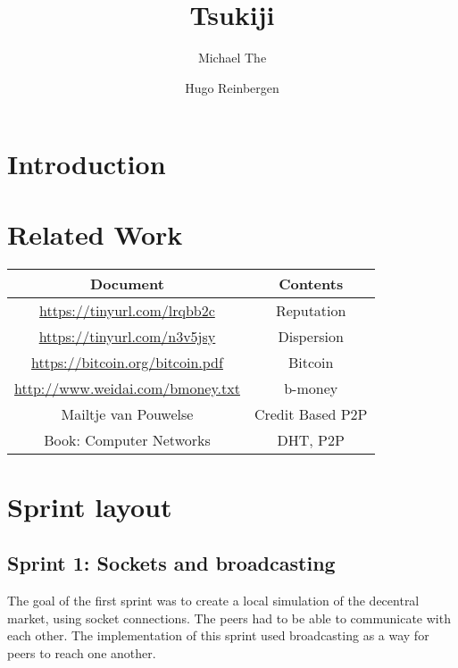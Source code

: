 \documentclass[]{article}
\title{Tsukiji}
\author{Michael The \and Hugo Reinbergen}
\begin{document}
\maketitle

\begin{abstract}

\end{abstract}

\section{Introduction}
\section{Related Work}
\begin{tabular}{|c|c|}
 \hline
 Document & Contents  \\
 \hline
 \url{https://tinyurl.com/lrqbb2c} & Reputation \\
 \url{https://tinyurl.com/n3v5jsy} & Dispersion \\
 \url{https://bitcoin.org/bitcoin.pdf} & Bitcoin \\
 \url{http://www.weidai.com/bmoney.txt} & b-money \\
 Mailtje van Pouwelse & Credit Based P2P \\
 Book: Computer Networks & DHT, P2P \\
 \hline
\end{tabular} 
\section{Sprint layout}
\subsection{Sprint 1: Sockets and broadcasting}
The goal of the first sprint was to create a local simulation of the decentral market, using socket connections. The peers had to be able to communicate with each other. The implementation of this sprint used broadcasting as a way for peers to reach one another. 
\end{document}

